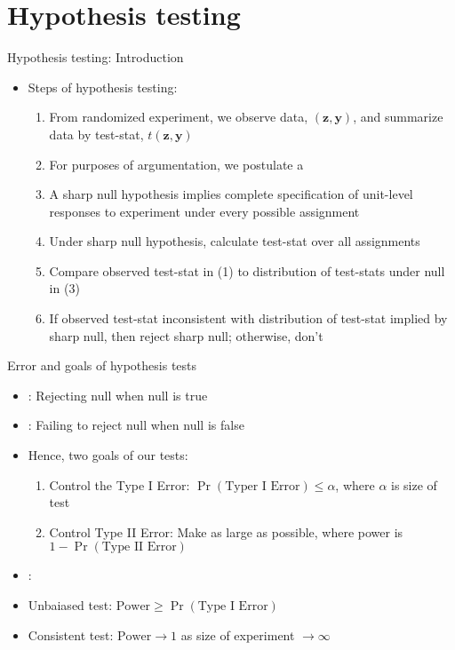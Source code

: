 \documentclass[table, xcolor = {dvipsnames}, 9pt]{beamer}
\theoremstyle{plain}
\begin{document}
\section{Hypothesis testing}
\begin{frame}{Hypothesis testing: Introduction}
\vfill
\begin{itemize}
\item Steps of hypothesis testing: \vfill
\begin{enumerate}
\item From randomized experiment, we observe data, $(\bm{z}, \bm{y})$, and summarize data by test-stat, $t(\bm{z}, \bm{y})$
\item For purposes of argumentation, we postulate a 
\item[] A sharp null hypothesis implies complete specification of unit-level responses to experiment under every possible assignment
\item Under sharp null hypothesis, calculate test-stat over all assignments
\item Compare observed test-stat in (1) to distribution of test-stats under null in (3)
\item If observed test-stat inconsistent with distribution of test-stat implied by sharp null, then reject sharp null; otherwise, don't
\end{enumerate}
\end{itemize} \vfill
\end{frame}
\begin{frame}{Error and goals of hypothesis tests}
\vfill
\begin{itemize}
\item {}: Rejecting null when null is true
\item {}: Failing to reject null when null is false
\item Hence, two goals of our tests:
\begin{enumerate}
\item Control the Type I Error: $\Pr\left(\text{Typer I Error}\right) \leq \alpha$, where $\alpha$ is size of test
\item Control Type II Error: Make  as large as possible, where power is $1 - \Pr\left(\text{Type II Error}\right)$
\end{enumerate}
\item {}:
\item[] Unbaiased test: $\text{Power} \geq \Pr\left(\text{Type I Error}\right)$
\item[] Consistent test: $\text{Power} \to 1$ as size of experiment $\to \infty$
\end{itemize} \vfill
\end{frame}
\end{document}
